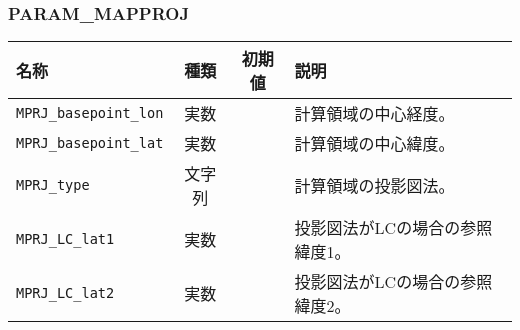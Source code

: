 

\subsubsection{PARAM\_MAPPROJ}
\begin{tabularx}{150mm}{|l|c|c|X|} \hline
 \rowcolor[gray]{0.9} 名称 & 種類 & 初期値 & 説明 \\ \hline
 \verb|MPRJ_basepoint_lon| & 実数 &  & 計算領域の中心経度。 \\ \hline
 \verb|MPRJ_basepoint_lat| & 実数 &  & 計算領域の中心緯度。 \\ \hline
 \verb|MPRJ_type| & 文字列 &  & 計算領域の投影図法。 \\ \hline
 \verb|MPRJ_LC_lat1| & 実数 &  & 投影図法がLCの場合の参照緯度1。 \\ \hline
 \verb|MPRJ_LC_lat2| & 実数 &  & 投影図法がLCの場合の参照緯度2。 \\ \hline
\end{tabularx}



